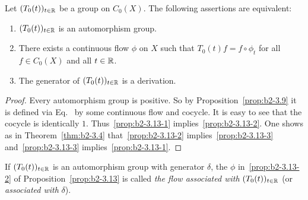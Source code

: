 \begin{proposition}\label{prop:b2-3.13}
Let $(T_{0}(t))_{t \in \mathbb{R}}$ be a group on $C_{0}(X)$.
The following assertions are equivalent:
\begin{enumerate}[\upshape (a)]
\item \label{prop:b2-3.13-1}
$(T_{0}(t))_{t \in \mathbb{R}}$ is an automorphism group.
\item \label{prop:b2-3.13-2}
There exists a continuous flow $\phi$ on $X$ such that $T_{0}(t)f = f \circ \phi_{t}$  for all
 $f \in C_{0}(X)$ and all $t \in \mathbb{R}$.
\item \label{prop:b2-3.13-3} 
The generator of\/ $(T_{0}(t))_{t \in \mathbb{R}}$ is a derivation.
\end{enumerate}
\end{proposition}
\begin{proof}
Every automorphism group is positive.
So by Proposition~\ref{prop:b2-3.9}  it is defined via Eq.~ by some continuous flow and cocycle.
It is easy to see that the cocycle is identically $1$.
Thus~\ref{prop:b2-3.13-1} implies~\ref{prop:b2-3.13-2}.
One shows as in Theorem~\ref{thm:b2-3.4}  that~\ref{prop:b2-3.13-2} implies~\ref{prop:b2-3.13-3} and~\ref{prop:b2-3.13-3} implies~\ref{prop:b2-3.13-1}.
\end{proof}
If\/ $(T_{0}(t))_{t \in \mathbb{R}}$ is an automorphism group with generator $\delta$, the $\phi$ in~\ref{prop:b2-3.13-2} of Proposition~\ref{prop:b2-3.13} is called \emph{the flow associated with} $(T_{0}(t))_{t \in \mathbb{R}}$ (or \emph{associated with} $\delta$).

